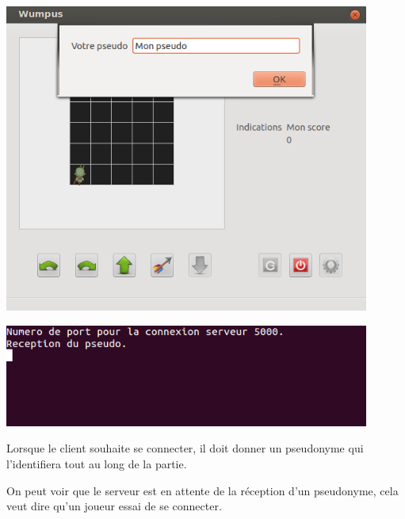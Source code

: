 \documentclass[a4paper,10pt]{article}
\begin{document}
		
		\begin{minipage}[t]{0.46\textwidth}
			\vspace{2pt}
			\centering
			\includegraphics[width=0.9\textwidth]{JeuxDEssais/Wumpus2.png}
		\end{minipage}
		\hfill
		\begin{minipage}[t]{0.46\textwidth}
			\vspace{55pt}
			\centering
			\includegraphics[width=0.9\textwidth]{JeuxDEssais/Serveur2.png}
		\end{minipage}

		\begin{minipage}[t]{0.46\textwidth}
			\vspace{2pt}
			Lorsque le client souhaite se connecter, il doit donner un pseudonyme qui l'identifiera tout au long de la partie.
		\end{minipage}
		\hfill
		\begin{minipage}[t]{0.46\textwidth}
			\vspace{2pt}
			On peut voir que le serveur est en attente de la réception d'un pseudonyme, cela veut dire qu'un joueur essai de se connecter.
		\end{minipage}\\
\end{document}
